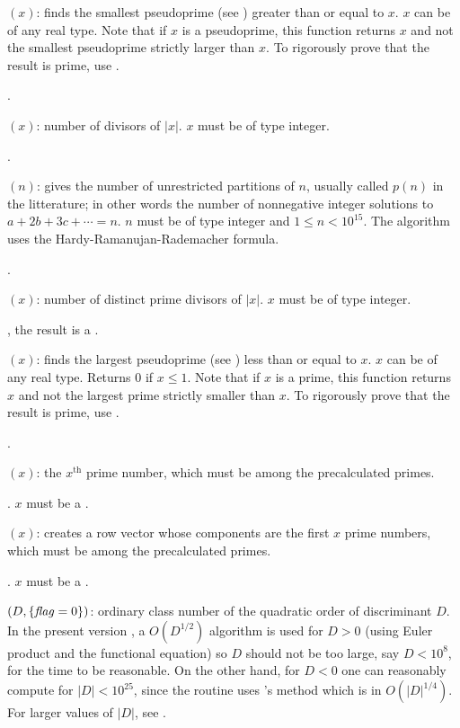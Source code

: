 $(x)$: finds the smallest pseudoprime (see
) greater than or equal to $x$. $x$ can be of any real
type. Note that if $x$ is a pseudoprime, this function returns $x$ and not
the smallest pseudoprime strictly larger than $x$. To rigorously prove that
the result is prime, use .

.

$(x)$: number of divisors of $|x|$. $x$ must be of type
integer.

.

$(n)$: gives the number of unrestricted partitions of
$n$, usually called $p(n)$ in the litterature; in other words the number of
nonnegative integer solutions to $a+2b+3c+\cdots=n$. $n$ must be of type
integer and $1\le n<10^{15}$. The algorithm uses the
Hardy-Ramanujan-Rademacher formula.

.

$(x)$: number of distinct prime divisors of $|x|$. $x$
must be of type integer.

, the result is a .

$(x)$: finds the largest pseudoprime (see
) less than or equal to $x$. $x$ can be of any real type.
Returns 0 if $x\le1$. Note that if $x$ is a prime, this function returns $x$
and not the largest prime strictly smaller than $x$. To rigorously prove that
the result is prime, use .

.

$(x)$: the $x^{\text{th}}$ prime number, which must be among
the precalculated primes.

. $x$ must be a .

$(x)$: creates a row vector whose components
are the first $x$ prime numbers, which must be among the precalculated primes.

. $x$ must be a .

$(D,\{\hbox{\it f\kern0pt lag\/}=0\})$: ordinary class number of the quadratic
order of discriminant $D$. In the present version \vers, a $O(D^{1/2})$
algorithm is used for $D > 0$ (using Euler product and the functional
equation) so $D$ should not be too large, say $D < 10^8$, for the time to be
reasonable. On the other hand, for $D < 0$ one can reasonably compute
 for $|D|<10^{25}$, since the routine uses
's method which is in $O(|D|^{1/4})$. For larger values of $|D|$,
see .

